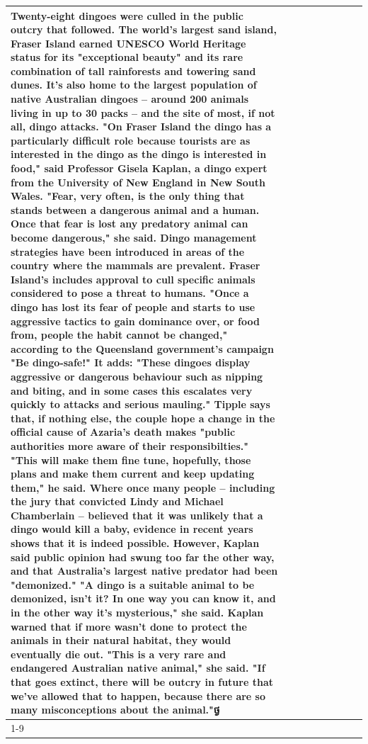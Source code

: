 \begin{table}[H]
\begin{tabular}{lllrlllll}
Twenty-eight dingoes were culled in the public outcry that followed. The world's largest sand island, Fraser Island earned UNESCO World Heritage status for its "exceptional beauty" and its rare combination of tall rainforests and towering sand dunes. It's also home to the largest population of native Australian dingoes -- around 200 animals living in up to 30 packs -- and the site of most, if not all, dingo attacks. "On Fraser Island the dingo has a particularly difficult role because tourists are as interested in the dingo as the dingo is interested in food," said Professor Gisela Kaplan, a dingo expert from the University of New England in New South Wales. "Fear, very often, is the only thing that stands between a dangerous animal and a human. Once that fear is lost any predatory animal can become dangerous," she said. Dingo management strategies have been introduced in areas of the country where the mammals are prevalent. Fraser Island's includes approval to cull specific animals considered to pose a threat to humans. "Once a dingo has lost its fear of people and starts to use aggressive tactics to gain dominance over, or food from, people the habit cannot be changed," according to the Queensland government's campaign "Be dingo-safe!" It adds: "These dingoes display aggressive or dangerous behaviour such as nipping and biting, and in some cases this escalates very quickly to attacks and serious mauling." Tipple says that, if nothing else, the couple hope a change in the official cause of Azaria's death makes "public authorities more aware of their responsibilties." "This will make them fine tune, hopefully, those plans and make them current and keep updating them," he said. Where once many people -- including the jury that convicted Lindy and Michael Chamberlain -- believed that it was unlikely that a dingo would kill a baby, evidence in recent years shows that it is indeed possible. However, Kaplan said public opinion had swung too far the other way, and that Australia's largest native predator had been "demonized." "A dingo is a suitable animal to be demonized, isn't it? In one way you can know it, and in the other way it's mysterious," she said. Kaplan warned that if more wasn't done to protect the animals in their natural habitat, they would eventually die out. "This is a very rare and endangered Australian native animal," she said. "If that goes extinct, there will be outcry in future that we've allowed that to happen, because there are so many misconceptions about the animal."ថ្ង \\
\cline{1-9}

\end{tabular}
\end{table}
